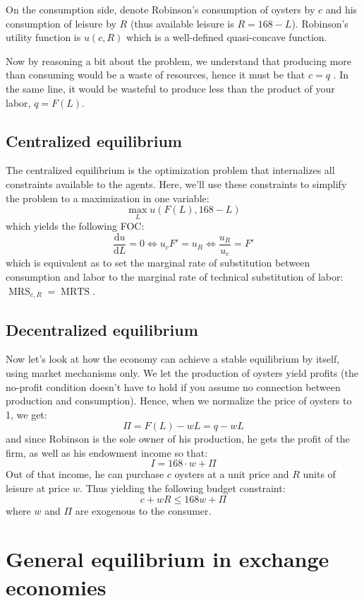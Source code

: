 \documentclass[12pt]{report}
\def\D{\mathrm{d}}
\begin{document}
On the consumption side, denote Robinson's consumption of oysters by $c$ and his consumption of leisure by $R$ (thus available leisure is $R = 168 - L$). Robinson's utility function is $u(c, R)$ which is a well-defined quasi-concave function.

Now by reasoning a bit about the problem, we understand that producing more than consuming would be a waste of resources, hence it must be that $c = q$ . In the same line, it would be wasteful to produce less than the product of your labor, $q = F(L)$.

\section{Centralized equilibrium}

The centralized equilibrium is the optimization problem that internalizes all constraints available to the agents. Here, we'll use these constraints to simplify the problem to a maximization in one variable:$$ \max_{L} u(F(L),168 - L) $$ which yields the following FOC: $$\frac{\D u}{\D L} = 0 \Leftrightarrow u_c F' = u_R \Leftrightarrow \frac{u_R}{u_c} = F' $$ which is equivalent as to set the marginal rate of substitution between consumption and labor to the marginal rate of technical substitution of labor: $ \operatorname{MRS}_{c,R} = \operatorname{MRTS}$.

\section{Decentralized equilibrium}

Now let's look at how the economy can achieve a stable equilibrium by itself, using market mechanisms only. We let the production of oysters yield profits (the no-profit condition doesn't have to hold if you assume no connection between production and consumption). Hence, when we normalize the price of oysters to 1, we get: $$\Pi = F(L) - wL = q - wL $$ and since Robinson is the sole owner of his production, he gets the profit of the firm, as well as his endowment income so that: $$ I = 168\cdot w + \Pi $$ Out of that income, he can purchase $c$ oysters at a unit price and $R$ units of leisure at price $w$. Thus yielding the following budget constraint: $$ c + wR \leq 168w + \Pi $$ where $w$ and $\Pi$ are exogenous to the consumer.

\chapter{General equilibrium in exchange economies}
\end{document}
